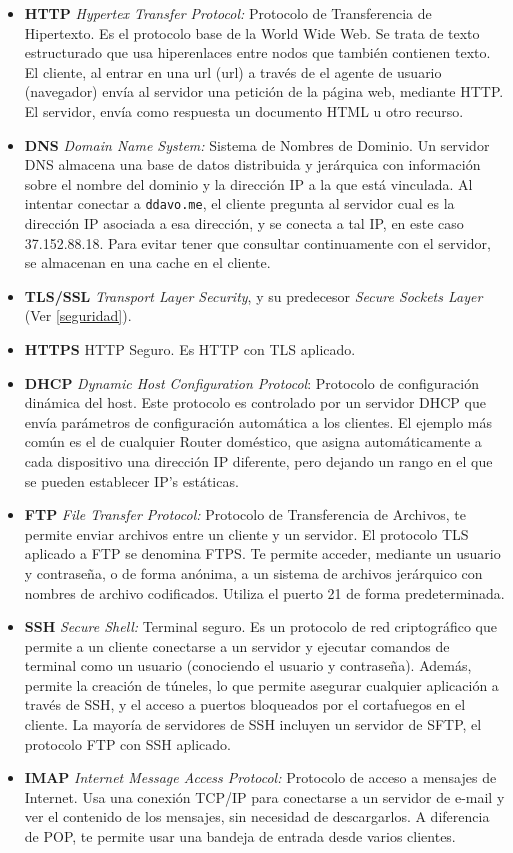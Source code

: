 \documentclass[a4paper, 11pt]{report} %
\newcommand{\acr}[1]{\acrshort{#1} (\acrlong{#1})}
\begin{document}
\begin{itemize}
\item \textbf{HTTP} \textit{Hypertex Transfer Protocol:} Protocolo de Transferencia de Hipertexto. Es el protocolo base de la World Wide Web. Se trata de texto estructurado que usa hiperenlaces entre nodos que también contienen texto. El cliente, al entrar en una \acr{url} a través de el agente de usuario (navegador) envía al servidor una petición de la página web, mediante HTTP. El servidor, envía como respuesta un documento HTML u otro recurso.
\item \textbf{DNS} \textit{Domain Name System:} Sistema de Nombres de Dominio. Un servidor DNS almacena una base de datos distribuida y jerárquica con información sobre el nombre del dominio y la dirección IP a la que está vinculada. Al intentar conectar a  \texttt{ddavo.me}, el cliente pregunta al servidor cual es la dirección IP asociada a esa dirección, y se conecta a tal IP, en este caso 37.152.88.18. Para evitar tener que consultar continuamente con el servidor, se almacenan en una \gls{cache} en el cliente.
\item \textbf{TLS/SSL} \textit{Transport Layer Security}, y su predecesor \textit{Secure Sockets Layer} (Ver \ref{seguridad}).
\item \textbf{HTTPS} HTTP Seguro. Es HTTP con TLS aplicado.
\item \textbf{DHCP} \textit{Dynamic Host Configuration Protocol}: Protocolo de configuración dinámica del host. Este protocolo es controlado por un servidor DHCP que envía parámetros de configuración automática a los clientes. El ejemplo más común es el de cualquier Router doméstico, que asigna automáticamente a cada dispositivo una dirección IP diferente, pero dejando un rango en el que se pueden establecer IP's estáticas.
\item \textbf{FTP} \textit{File Transfer Protocol:} Protocolo de Transferencia de Archivos, te permite enviar archivos entre un cliente y un servidor. El protocolo TLS aplicado a FTP se denomina FTPS. Te permite acceder, mediante un usuario y contraseña, o de forma anónima, a un sistema de archivos jerárquico con nombres de archivo codificados. Utiliza el puerto 21 de forma predeterminada.
\item \textbf{SSH} \textit{Secure Shell:} Terminal seguro. Es un protocolo de red criptográfico que permite a un cliente conectarse a un servidor y ejecutar comandos de terminal como un usuario (conociendo el usuario y contraseña). Además, permite la creación de túneles, lo que permite asegurar cualquier aplicación a través de SSH, y el acceso a puertos bloqueados por el cortafuegos en el cliente. La mayoría de servidores de SSH incluyen un servidor de SFTP, el protocolo FTP con SSH aplicado.
\item \textbf{IMAP} \textit{Internet Message Access Protocol:} Protocolo de acceso a mensajes de Internet. Usa una conexión TCP/IP para conectarse a un servidor de e-mail y ver el contenido de los mensajes, sin necesidad de descargarlos. A diferencia de POP, te permite usar una bandeja de entrada desde varios clientes.
\end{itemize}
\end{document}
